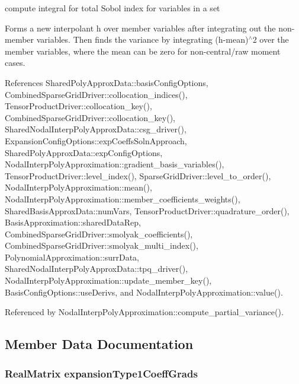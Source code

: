 compute integral for total Sobol\textquotesingle{} index for variables in a set 

Forms a new interpolant h over member variables after integrating out the non-\/member variables. Then finds the variance by integrating (h-\/mean)$^\wedge$2 over the member variables, where the mean can be zero for non-\/central/raw moment cases. 

References Shared\+Poly\+Approx\+Data\+::basis\+Config\+Options, Combined\+Sparse\+Grid\+Driver\+::collocation\+\_\+indices(), Tensor\+Product\+Driver\+::collocation\+\_\+key(), Combined\+Sparse\+Grid\+Driver\+::collocation\+\_\+key(), Shared\+Nodal\+Interp\+Poly\+Approx\+Data\+::csg\+\_\+driver(), Expansion\+Config\+Options\+::exp\+Coeffs\+Soln\+Approach, Shared\+Poly\+Approx\+Data\+::exp\+Config\+Options, Nodal\+Interp\+Poly\+Approximation\+::gradient\+\_\+basis\+\_\+variables(), Tensor\+Product\+Driver\+::level\+\_\+index(), Sparse\+Grid\+Driver\+::level\+\_\+to\+\_\+order(), Nodal\+Interp\+Poly\+Approximation\+::mean(), Nodal\+Interp\+Poly\+Approximation\+::member\+\_\+coefficients\+\_\+weights(), Shared\+Basis\+Approx\+Data\+::num\+Vars, Tensor\+Product\+Driver\+::quadrature\+\_\+order(), Basis\+Approximation\+::shared\+Data\+Rep, Combined\+Sparse\+Grid\+Driver\+::smolyak\+\_\+coefficients(), Combined\+Sparse\+Grid\+Driver\+::smolyak\+\_\+multi\+\_\+index(), Polynomial\+Approximation\+::surr\+Data, Shared\+Nodal\+Interp\+Poly\+Approx\+Data\+::tpq\+\_\+driver(), Nodal\+Interp\+Poly\+Approximation\+::update\+\_\+member\+\_\+key(), Basis\+Config\+Options\+::use\+Derivs, and Nodal\+Interp\+Poly\+Approximation\+::value().



Referenced by Nodal\+Interp\+Poly\+Approximation\+::compute\+\_\+partial\+\_\+variance().



\subsection{Member Data Documentation}
\subsubsection[{\texorpdfstring{expansion\+Type1\+Coeff\+Grads}{expansionType1CoeffGrads}}]{\setlength{\rightskip}{0pt plus 5cm}Real\+Matrix expansion\+Type1\+Coeff\+Grads\hspace{0.3cm}{\ttfamily [private]}}\label{classPecos_1_1NodalInterpPolyApproximation_af95aafb683b36750f8e24fb858cbe8b2}


